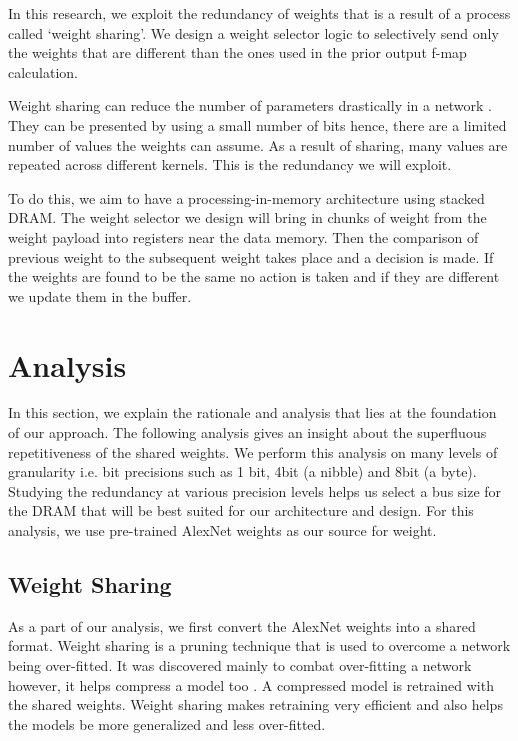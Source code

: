 \documentclass[conference]{IEEEtran}
\begin{document}
In this research, we exploit the redundancy of weights that is a result of a process called `weight sharing'\cite{han2015deep}. We design a weight selector logic to selectively send only the weights that are different than the ones used in the prior output f-map calculation. 

Weight sharing can reduce the number of parameters drastically in a network \cite{han2016eie}. They can be presented by using a small number of bits hence, there are a limited number of values the weights can assume. As a result of sharing, many values are repeated across different kernels. This is the redundancy we will exploit.

To do this, we aim to have a processing-in-memory architecture  using stacked DRAM. The weight selector we design will bring in chunks of weight from the weight payload into registers near the data memory. Then the comparison of previous weight to the subsequent weight takes place and a decision is made. If the weights are found to be the same no action is taken and if they are different we update them in the buffer. 

%



\section{Analysis}

In this section, we explain the rationale and analysis that lies at the foundation of our approach. The following analysis gives an insight about the superfluous repetitiveness of the shared weights. We perform this analysis on many levels of granularity i.e. bit precisions such as 1 bit, 4bit (a nibble) and 8bit (a byte). Studying the redundancy at various precision levels helps us select a bus size for the DRAM that will be best suited for our architecture and design. For this analysis, we use pre-trained AlexNet weights as our source for weight\cite{alexnet_matlab}.

\subsection{Weight Sharing} 
As a part of our analysis, we first convert the AlexNet weights into a shared format. Weight sharing is a pruning technique that is used to overcome a network being over-fitted. It was discovered mainly to combat over-fitting a network however, it helps  compress a model too \cite{zhu2017prune, li2016pruning, han2015deep, anwar2017structured}. A compressed model is retrained with the shared weights. Weight sharing makes retraining very efficient and also helps the models be more generalized and less over-fitted. 
\end{document}
